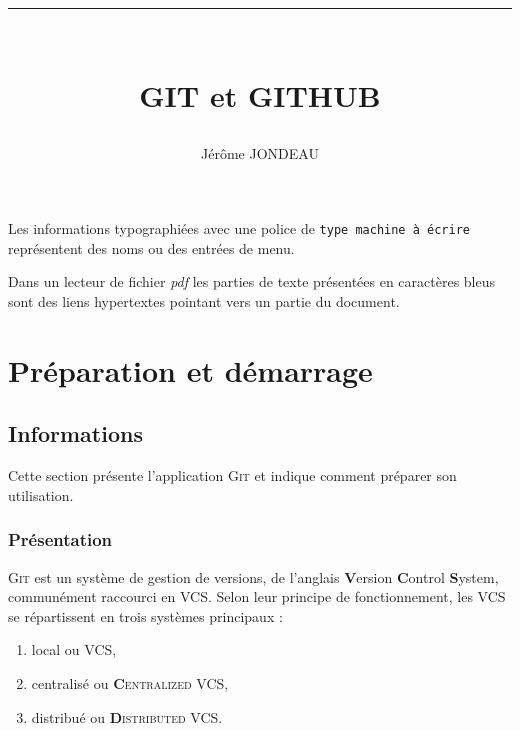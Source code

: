\documentclass[11pt,twoside,headings=normal,open=right,french,DIV=12]{scrreprt}
\title{\rule{\linewidth}{1pt}\\ \Huge GIT et GITHUB}
\subtitle{\vspace{\fill}\huge Notes\\[-3mm]\rule{\linewidth}{1pt}}
\author{Jérôme JONDEAU}
\date{}
\newcommand{\git}{\textsc{Git}}
\begin{document}
    \renewcommand{\contentsname}{Sommaire}



	\maketitle


    
    \tableofcontents






	Les informations typographiées avec une police de \texttt{type machine à écrire} représentent des noms ou des entrées de menu.
	
	Dans un lecteur de fichier \emph{pdf} les parties de texte présentées en caractères bleus sont des liens
	hypertextes pointant vers un partie du document.
	


\chapter{Préparation et démarrage}	



\section{Informations}



    Cette section présente l'application \git{} et indique comment préparer son utilisation.


\subsection{Présentation}



    \git{} est un système de gestion de versions, de l'anglais \textbf{V}ersion \textbf{C}ontrol \textbf{S}ystem,
    communément raccourci en \textsc{VCS}. Selon leur principe de fonctionnement, les \textsc{VCS} se répartissent
    en trois systèmes principaux :
    \begin{enumerate}
        \item local ou \textsc{VCS},
        \item centralisé ou \textbf{C}\textsc{entralized VCS},
        \item distribué ou \textbf{D}\textsc{istributed VCS}.
    \end{enumerate}
\end{document}
